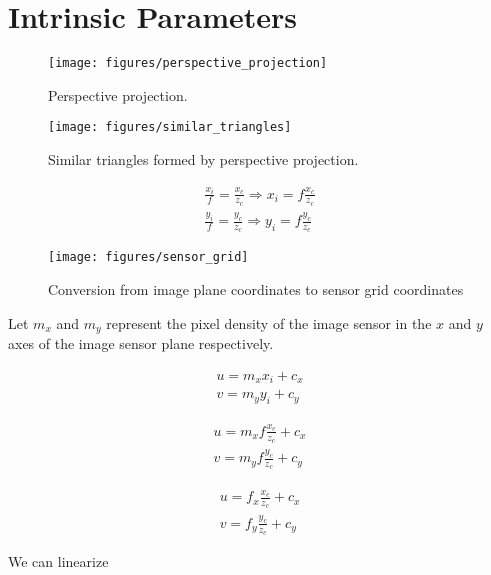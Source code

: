 \section{Intrinsic Parameters}

\begin{figure}[h!]
    \centering
    \texttt{[image: figures/perspective\_projection]}
    \caption{Perspective projection.}
\end{figure}

\begin{figure}[h!]
    \centering
    \texttt{[image: figures/similar\_triangles]}
    \caption{Similar triangles formed by perspective projection.}
\end{figure}

\begin{gather}
    \frac{x_i}{f} = \frac{x_c}{z_c} \Rightarrow x_i = f \frac{x_c}{z_c} \\
    \frac{y_i}{f} = \frac{y_c}{z_c} \Rightarrow y_i = f \frac{y_c}{z_c}
\end{gather}

\begin{figure}[h!]
    \centering
    \texttt{[image: figures/sensor\_grid]}
    \caption{Conversion from image plane coordinates to sensor grid coordinates}
\end{figure}


Let $m_x$ and $m_y$ represent the pixel density of the image sensor in the $x$ and $y$ axes of the image sensor plane respectively.


\begin{align*}
    u = m_x x_i + c_x \\
    v = m_y y_i + c_y
\end{align*}

\begin{align*}
    u = m_x f \frac{x_c}{z_c} + c_x \\
    v = m_y f \frac{y_c}{z_c} + c_y
\end{align*}

\begin{subequations}
    \begin{gather}
        u = f_x \frac{x_c}{z_c} + c_x \\
        v = f_y \frac{y_c}{z_c} + c_y
    \end{gather}
\end{subequations}

We can linearize 

